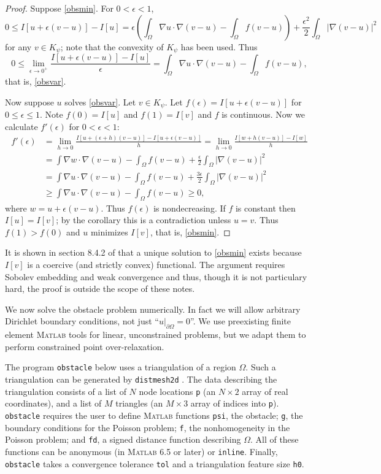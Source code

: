 \documentclass[12pt,final]{amsart}
\newcommand{\mtt}{\texttt}
\theoremstyle{definition}
\newcommand{\eps}{\epsilon}
\newcommand{\grad}{\nabla}
\newcommand{\Matlab}{\textsc{Matlab}\xspace}
\begin{document}
\begin{proof}  Suppose \eqref{obsmin}.  For $0<\eps<1$,
    $$0 \le I[u+\eps(v-u)] - I[u] = \eps \left(\int_\Omega \grad u\cdot \grad(v-u) - \int_\Omega f(v-u)\right) + \frac{\eps^2}{2} \int_\Omega |\grad(v-u)|^2$$
for any $v\in K_\psi$; note that the convexity of $K_\psi$ has been used.  Thus
    $$0 \le \lim_{\eps\to 0^+} \frac{I[u+\eps(v-u)] - I[u]}{\eps} = \int_\Omega \grad u\cdot \grad(v-u) - \int_\Omega f(v-u),$$
that is, \eqref{obsvar}.

Now suppose $u$ solves \eqref{obsvar}.  Let $v\in K_\psi$.  Let $f(\eps)=I[u+\eps(v-u)]$ for $0\le \eps \le 1$.  Note $f(0)=I[u]$ and $f(1)=I[v]$ and $f$ is continuous.  Now we calculate $f'(\eps)$ for $0<\eps<1$:
\begin{align*}
f'(\eps) &= \lim_{h\to 0} \frac{I[u+(\eps+h)(v-u)] - I[u+\eps(v-u)]}{h} = \lim_{h\to 0} \frac{I[w+h(v-u)] - I[w]}{h} \\
    &= \int \grad w\cdot \grad(v-u) - \int_\Omega f(v-u) + \frac{\eps}{2} \int_\Omega |\grad(v-u)|^2 \\
    &= \int \grad u\cdot \grad(v-u) - \int_\Omega f(v-u) + \frac{3\eps}{2} \int_\Omega |\grad(v-u)|^2 \\
    &\ge \int \grad u\cdot \grad(v-u) - \int_\Omega f(v-u) \ge 0,
\end{align*}
where $w=u+\eps(v-u)$.  Thus $f(\eps)$ is nondecreasing.  If $f$ is constant then $I[u]=I[v]$;  by the corollary this is a contradiction unless $u=v$.  Thus $f(1)>f(0)$ and $u$ minimizes $I[v]$, that is, \eqref{obsmin}.
\end{proof}

It is shown in section 8.4.2 of \cite{Evans} that a unique solution to \eqref{obsmin} exists because $I[v]$ is a coercive (and strictly convex) functional.  The argument requires Sobolev embedding and weak convergence and thus, though it is not particulary hard, the proof is outside the scope of these notes.

We now solve the obstacle problem numerically.  In fact we will allow arbitrary Dirichlet boundary conditions, not just ``$u\big|_{\partial\Omega} = 0$''.  We use preexisting finite element \Matlab tools \cite{BuelerPoissoncont,BuelerPoisson,PerssonStrang} for linear, unconstrained problems, but we adapt them to perform constrained point over-relaxation.

The program \mtt{obstacle} below uses a triangulation of a region $\Omega$.  Such a triangulation can be generated by \mtt{distmesh2d} \cite{PerssonStrang}.  The data describing the triangulation consists of a list of $N$ node locations \mtt{p} (an $N\times 2$ array of real coordinates), and a list of $M$ triangles (an $M\times 3$ array of indices into \mtt{p}).  \mtt{obstacle} requires the user to define \Matlab functions \mtt{psi}, the obstacle; \mtt{g}, the boundary conditions for the Poisson problem; \mtt{f}, the nonhomogeneity in the Poisson problem; and \mtt{fd}, a signed distance function describing $\Omega$.  All of these functions can be anonymous (in \Matlab 6.5 or later) or \mtt{inline}.  Finally, \mtt{obstacle} takes a convergence tolerance \mtt{tol} and a triangulation feature size \mtt{h0}.
\end{document}
